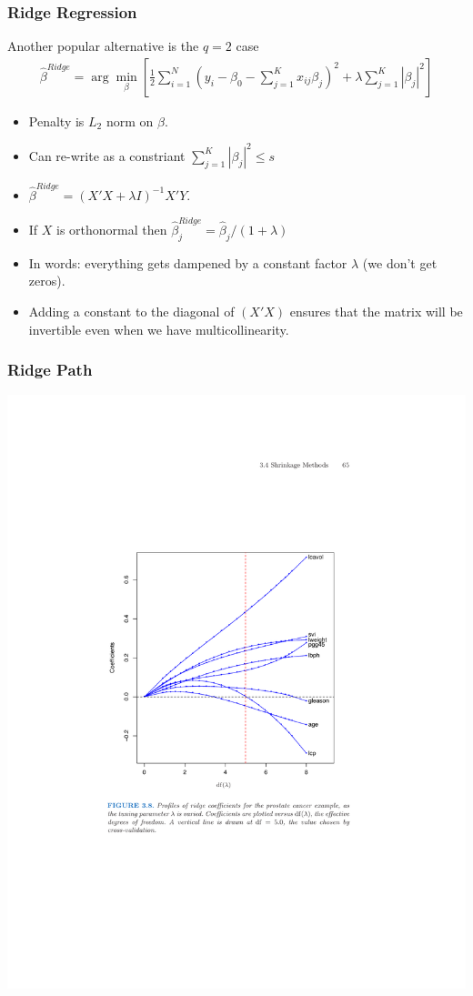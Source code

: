 \documentclass[xcolor=pdftex,dvipsnames,table,mathserif,aspectratio=169]{beamer}
\begin{document}
\begin{frame}
\frametitle{Ridge Regression}
Another popular alternative is the $q=2$ case
\begin{eqnarray*}
\hat{\beta}^{Ridge} = \arg \min_{\beta} \left[\frac{1}{2} \sum_{i=1}^N (y_i - \beta_0 - \sum_{j=1}^K x_{ij} \beta_j)^2 + \lambda \sum_{j=1}^K | \beta_j|^2 \right]
\end{eqnarray*}
\begin{itemize}
\item Penalty is $L_2$ norm on $\beta$.
\item Can re-write as a constriant  $\sum_{j=1}^K | \beta_j|^2 \leq s$
\item $\hat{\beta}^{Ridge} = (X'X + \lambda I )^{-1} X' Y$.
\item If $X$ is orthonormal then $\hat{\beta}_{j}^{Ridge} =  \hat{\beta}_j /(1 +\lambda )$
\item In words: everything gets dampened by a constant factor $\lambda$ (we don't get zeros).
\item Adding a constant to the diagonal of $(X'X)$ ensures that the matrix will be invertible even when we have multicollinearity.
\end{itemize}
\end{frame}

\begin{frame}
\frametitle{Ridge Path}
\begin{center}
\includegraphics[width=0.85\textheight]{./resources/ridgepath}
\end{center}
\end{frame}
\end{document}
